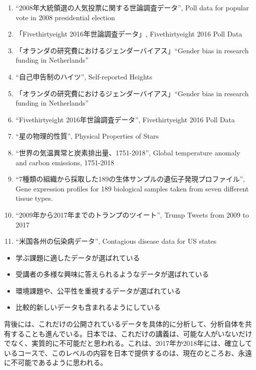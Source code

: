 \documentclass[
]{bxjsbook}
\providecommand{\tightlist}{%
  \setlength{\itemsep}{0pt}\setlength{\parskip}{0pt}}
\theoremstyle{definition}
\theoremstyle{definition}
\theoremstyle{definition}
\theoremstyle{definition}
\theoremstyle{remark}
\begin{document}
\begin{enumerate}
\item
  ``2008年大統領選の人気投票に関する世論調査データ'', Poll data for popular vote in 2008 presidential election\\
\item
  「Fivethirtyeight 2016年世論調査データ」, Fivethirtyeight 2016 Poll Data
\item
  「オランダの研究費におけるジェンダーバイアス」``Gender bias in research funding in Netherlands''\\
\item
  ``自己申告制のハイツ'', Self-reported Heights
\item
  「オランダの研究費におけるジェンダーバイアス」``Gender bias in research funding in Netherlands''\\
\item
  ``Fivethirtyeight 2016年世論調査データ'', Fivethirtyeight 2016 Poll Data
\item
  ``星の物理的性質'', Physical Properties of Stars
\item
  ``世界の気温異常と炭素排出量、1751-2018'', Global temperature anomaly and carbon emissions, 1751-2018\\
\item
  ``7種類の組織から採取した189の生体サンプルの遺伝子発現プロファイル'', Gene expression profiles for 189 biological samples taken from seven different tissue types.
\item
  ``2009年から2017年までのトランプのツイート'', Trump Tweets from 2009 to 2017
\item
  ``米国各州の伝染病データ'', Contagious disease data for US states
\end{enumerate}

\begin{itemize}
\tightlist
\item
  学ぶ課題に適したデータが選ばれている
\item
  受講者の多様な興味に答えられるようなデータが選ばれている
\item
  環境課題や、公平性を重視するデータが選ばれている
\item
  比較的新しいデータも含まれるようにしている
\end{itemize}

背後には、これだけの公開されているデータを具体的に分析して、分析自体を共有することも進んでいる。日本では、これだけの講義は、可能な人がいないだけでなく、実質的に不可能だと思われる。これは、2017年か2018年には、確立しているコースで、このレベルの内容を日本で提供するのは、現在のところお、永遠に不可能であるように思われる。
\end{document}
